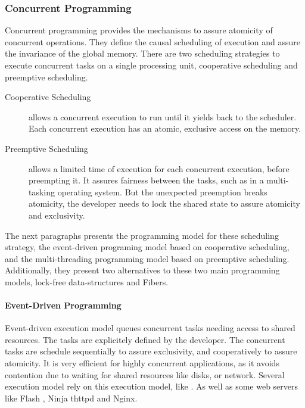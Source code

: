 \subsubsection{Concurrent Programming} \label{chapter3:software-efficiency:concurrency:concurrent-programming}


Concurrent programming provides the mechanisms to assure atomicity of concurrent operations.
They define the causal scheduling of execution and assure the invariance of the global memory.
There are two scheduling strategies to execute concurrent tasks on a single processing unit, cooperative scheduling and preemptive scheduling.

\begin{description}
\item[Cooperative Scheduling] allows a concurrent execution to run until it yields back to the scheduler.
Each concurrent execution has an atomic, exclusive access on the memory.
\item[Preemptive Scheduling] allows a limited time of execution for each concurrent execution, before preempting it.
It assures fairness between the tasks, such as in a multi-tasking operating system.
But the unexpected preemption breaks atomicity, the developer needs to lock the shared state to assure atomicity and exclusivity.
\end{description}

The next paragraphs presents the programming model for these scheduling strategy, the event-driven programing model based on cooperative scheduling, and the multi-threading programming model based on preemptive scheduling.
Additionally, they present two alternatives to these two main programming models, lock-free data-structures and Fibers.

\paragraph{Event-Driven Programming}

Event-driven execution model queues concurrent tasks needing access to shared resources.
The tasks are explicitely defined by the developer.
The concurrent tasks are schedule sequentially to assure exclusivity, and cooperatively to assure atomicity.
It is very efficient for highly concurrent applications, as it avoids contention due to waiting for shared resources like disks, or network.
Several execution model rely on this execution model, like .
As well as some web servers like Flash \cite{Pai1999}, Ninja \cite{Gribble2001} thttpd and Nginx.

